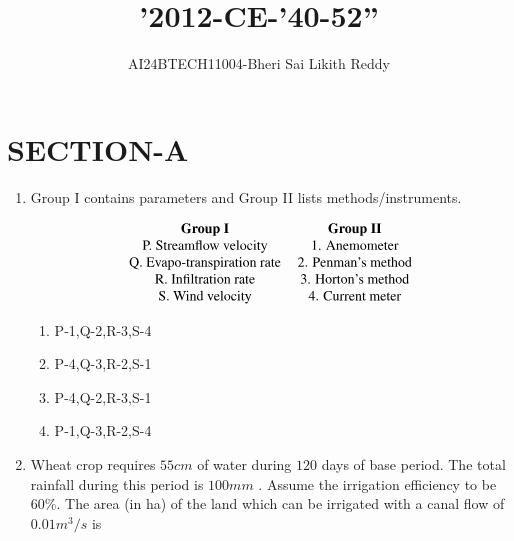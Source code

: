 \documentclass[journal]{IEEEtran}
\begin{document}

\onecolumn
\newpage
\title{'2012-CE-'40-52''}
\author{AI24BTECH11004-Bheri Sai Likith Reddy}
\maketitle
\section{SECTION-A}

\begin{enumerate}
       \item Group I contains parameters and Group II lists methods/instruments.
	       
        \begin{align*}
             \begin{tabular}{c c}
                \textbf{Group I} & \textbf{Group II}\\
                P. Streamflow velocity  &  1. Anemometer\\
                    Q. Evapo-transpiration rate & 2. Penman's method \\
                R. Infiltration rate& 3. Horton's method\\
                S. Wind velocity&4. Current meter
             \end{tabular}
             \end{align*}
             \begin{enumerate}
             \item P-1,Q-2,R-3,S-4
             \item P-4,Q-3,R-2,S-1
             \item P-4,Q-2,R-3,S-1
             \item P-1,Q-3,R-2,S-4
        	\end{enumerate}	
	\item Wheat crop requires $55 cm$ of water during $120$ days of base period. The total rainfall during this period is $100 mm$ . Assume the irrigation efficiency to be $60 \%$. The area (in ha) of the land which can be irrigated with a canal flow of $0.01m^3/s$ is 
               \begin{enumerate}
\end{enumerate}
\end{enumerate}
\end{document}
